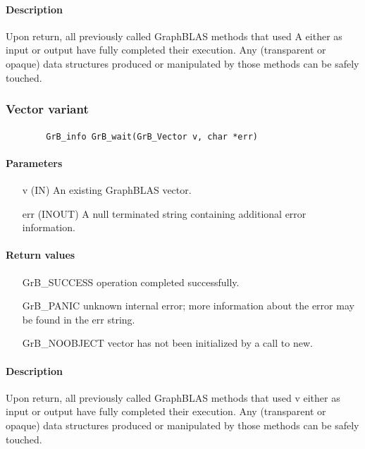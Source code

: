 {\paragraph{Description}

Upon return, all previously called GraphBLAS methods that used {\sf A} either as 
input or output have fully completed their execution.
Any (transparent or opaque) data structures produced or manipulated by those 
methods can be safely touched.


\subsubsection{Vector variant}

\paragraph{\syntax}

\begin{verbatim}
        GrB_info GrB_wait(GrB_Vector v, char *err)
\end{verbatim}

\paragraph{Parameters}

\begin{itemize}[leftmargin=1.1in]
	    \item[{\sf v}]   ({\sf IN})     An existing GraphBLAS vector.
        \item[{\sf err}] ({\sf INOUT})  A null terminated string containing additional error
information.
\end{itemize}

\paragraph{Return values}
\begin{itemize}[leftmargin=2.1in]
\item[{\sf GrB\_SUCCESS}]	operation completed successfully.
\item[{\sf GrB\_PANIC}]		unknown internal error; more information about the error may be found in the {\sf err} string.
\item[{\sf GrB\_NOOBJECT}]  vector has not been initialized by a
                            call to {\sf new}.
\end{itemize}

\paragraph{Description}

Upon return, all previously called GraphBLAS methods that used {\sf v} either as
input or output have fully completed their execution.  Any (transparent or opaque)
data structures produced or manipulated by those methods can be safely touched.
}
